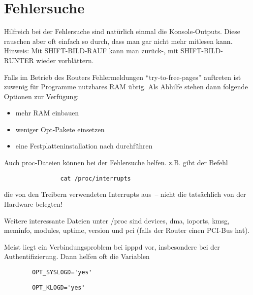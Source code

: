     \section{Fehlersuche}

    Hilfreich bei der Fehlersuche sind natürlich einmal die
    Konsole-Outputs.  Diese rauschen aber oft einfach so durch, dass
    man gar nicht mehr mitlesen kann. Hinweis: Mit SHIFT-BILD-RAUF
    kann man zurück-, mit SHIFT-BILD-RUNTER wieder vorblättern.

    Falls im Betrieb des Routers Fehlermeldungen ``try-to-free-pages''
    auftreten ist zuwenig für Programme nutzbares RAM übrig. Als
    Abhilfe stehen dann folgende Optionen zur Verfügung:
    \begin{itemize}
    \item mehr RAM einbauen
    \item weniger Opt-Pakete einsetzen
    \item eine Festplatteninstallation nach 
      durchführen
    \end{itemize}

    Auch proc-Dateien können bei der Fehlersuche helfen. z.B. gibt der
    Befehl

\begin{example}
\begin{verbatim}
                cat /proc/interrupts
\end{verbatim}
\end{example}
    
    die von den Treibern verwendeten Interrupts aus~-- nicht die
    tatsächlich von der Hardware belegten!
    
    Weitere interessante Dateien unter /proc sind devices, dma,
    ioports, kmsg, meminfo, modules, uptime, version und pci (falls
    der Router einen PCI-Bus hat).
    
    Meist liegt ein Verbindungsproblem bei ipppd vor, insbesondere bei
    der Authentifizierung. Dann helfen oft die Variablen

\begin{example}
\begin{verbatim}
        OPT_SYSLOGD='yes'
\end{verbatim}
\end{example}

\begin{example}
\begin{verbatim}
        OPT_KLOGD='yes'
\end{verbatim}
\end{example}

